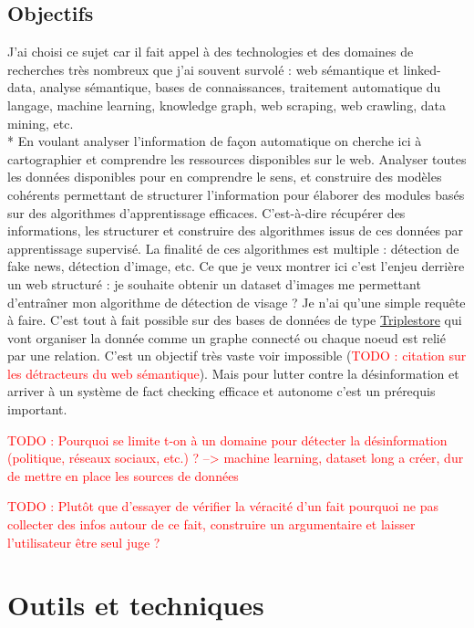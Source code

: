 \documentclass[12pt]{article}
\newcommand\todo[1]{\textcolor{red}{TODO : #1}}
\begin{document}
\subsection{Objectifs}

J'ai choisi ce sujet car il fait appel à des technologies et des domaines de recherches très nombreux que j'ai souvent survolé : web sémantique et linked-data, analyse sémantique, bases de connaissances, traitement automatique du langage, machine learning, knowledge graph, web scraping, web crawling, data mining, etc. 
\\*
En voulant analyser l'information de façon automatique on cherche ici à cartographier et comprendre les ressources disponibles sur le web. Analyser toutes les données disponibles pour en comprendre le sens, et construire des modèles cohérents permettant de structurer l'information pour élaborer des modules basés sur des algorithmes d'apprentissage efficaces. C'est-à-dire récupérer des informations, les structurer et construire des algorithmes issus de ces données par apprentissage supervisé. La finalité de ces algorithmes est multiple : détection de fake news, détection d'image, etc. Ce que je veux montrer ici c'est l'enjeu derrière un web structuré : je souhaite obtenir un dataset d'images me permettant d'entraîner mon algorithme de détection de visage ? Je n'ai qu'une simple requête à faire. C'est tout à fait possible sur des bases de données de type \href{https://fr.wikipedia.org/wiki/Triplestore}{Triplestore} \cite{wiki:Triplestore} qui vont organiser la donnée comme un graphe connecté ou chaque noeud est relié par une relation. C'est un objectif très vaste voir impossible (\todo{citation sur les détracteurs du web sémantique}). Mais pour lutter contre la désinformation et arriver à un système de fact checking efficace et autonome c'est un prérequis important.

\todo{Pourquoi se limite t-on à un domaine pour détecter la désinformation (politique, réseaux sociaux, etc.) ? --> machine learning, dataset long a créer, dur de mettre en place les sources de données}

\todo{Plutôt que d'essayer de vérifier la véracité d'un fait pourquoi ne pas collecter des infos autour de ce fait, construire un argumentaire et laisser l'utilisateur être seul juge ?}

\section{Outils et techniques}
\end{document}
